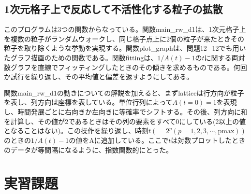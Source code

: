 \documentclass{jsarticle}
\begin{document}
        \subsection{1次元格子上で反応して不活性化する粒子の拡散}
            
            このプログラムは3つの関数からなっている。関数main\_rw\_d1は、1次元格子上を複数の粒子がランダムウォークし、同じ格子点上に2個の粒子が来たときその粒子を取り除くような挙動を実現する。関数plot\_graphは、問題12−12でも用いたグラフ描画のための関数である。関数fittingは、$1/A(t)-1$の$t$に関する両対数グラフを直線でフィッティングしたときのその傾きを求めるものである。何回か試行を繰り返し、その平均値と偏差を返すようにしてある。
            
            関数main\_rw\_d1の動きについての解説を加えると、まずlatticeは行方向が粒子を表し、列方向は座標を表している。単位行列によって$A(t=0)=1$を表現し、時間発展ごとに右向きか左向きに等確率でシフトする。その後、列方向に和を計算し、その値が2であるときはその列の要素をすべて0にしている(2以上の値となることはない)。この操作を繰り返し、時刻$t(=2^{p}(p = 1,2,3,\cdots, \mathrm{pmax}))$のときの$1/A(t)-1$の値をAに追加している。ここで$t$は対数プロットしたときのデータが等間隔になるように、指数関数的にとった。
            
    \section{実習課題}
    
\end{document}
